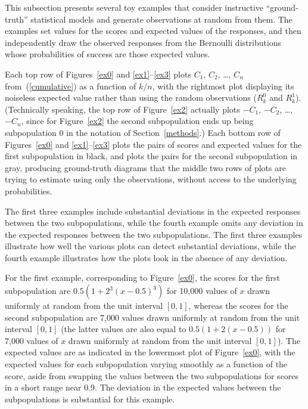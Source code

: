 \documentclass{article}
\begin{document}
This subsection presents several toy examples
that consider instructive ``ground-truth'' statistical models
and generate observations at random from them.
The examples set values for the scores and expected values of the responses,
and then independently draw the observed responses
from the Bernoulli distributions whose probabilities of success
are those expected values.

Each top row of Figures~\ref{ex0} and \ref{ex1}--\ref{ex3}
plots $C_1$, $C_2$, \dots, $C_n$
from~(\ref{cumulative}) as a function of $k/n$,
with the rightmost plot displaying its noiseless expected value
rather than using the random observations ($R^0_k$ and $R^1_k$).
(Technically speaking, the top row of Figure~\ref{ex2} actually plots
$-C_1$, $-C_2$, \dots, $-C_n$, since for Figure~\ref{ex2}
the second subpopulation ends up being subpopulation 0
in the notation of Section~\ref{methods}.)
Each bottom row of Figures~\ref{ex0} and \ref{ex1}--\ref{ex3} plots the pairs
of scores and expected values for the first subpopulation in black,
and plots the pairs for the second subpopulation in gray,
producing ground-truth diagrams that the middle two rows of plots
are trying to estimate using only the observations,
without access to the underlying probabilities.

The first three examples include substantial deviations
in the expected responses between the two subpopulations,
while the fourth example omits any deviation
in the expected responses between the two subpopulations.
The first three examples illustrate how well the various plots can detect
substantial deviations, while the fourth example illustrates how the plots look
in the absence of any deviation.

For the first example, corresponding to Figure~\ref{ex0},
the scores for the first subpopulation
are $0.5 (1 + 2^3 (x - 0.5)^3)$ for 10,000 values of $x$
drawn uniformly at random from the unit interval $[0, 1]$,
whereas the scores for the second subpopulation are 7,000 values
drawn uniformly at random from the unit interval $[0, 1]$
(the latter values are also equal to $0.5 (1 + 2 (x - 0.5))$
for 7,000 values of $x$ drawn uniformly at random from the unit interval
$[0, 1]$).
The expected values are as indicated in the lowermost plot of Figure~\ref{ex0},
with the expected values for each subpopulation varying smoothly
as a function of the score, aside from swapping the values between
the two subpopulations for scores in a short range near 0.9.
The deviation in the expected values between the subpopulations
is substantial for this example.
\end{document}
